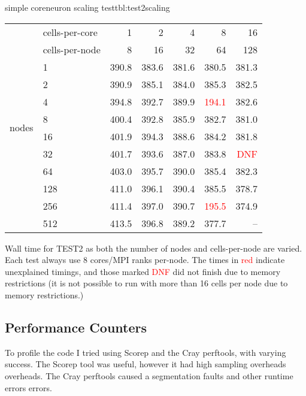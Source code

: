 \begin{mytable}{simple coreneuron scaling test}{tbl:test2scaling}
\begin{center}
\begin{tabular}{l|l|rrrrr}
\multirow{2}{*}{}
& cells-per-core  &    1  & 2     & 4     & 8  & 16  \\
& cells-per-node  &    8  & 16    & 32    & 64 & 128 \\
\hline
\multirow{8}{*}{nodes}
&1                & 390.8 & 383.6 & 381.6 & 380.5 & 381.3\\
&2                & 390.9 & 385.1 & 384.0 & 385.3 & 382.5\\
&4                & 394.8 & 392.7 & 389.9 & \textcolor{red}{194.1} & 382.6\\
&8                & 400.4 & 392.8 & 385.9 & 382.7 & 381.0\\
&16               & 401.9 & 394.3 & 388.6 & 384.2 & 381.8\\
&32               & 401.7 & 393.6 & 387.0 & 383.8 & \textcolor{red}{DNF}\\
&64               & 403.0 & 395.7 & 390.0 & 385.4 & 382.3 \\
&128              & 411.0 & 396.1 & 390.4 & 385.5 & 378.7 \\
&256              & 411.4 & 397.0 & 390.7 & \textcolor{red}{195.5} & 374.9\\
&512              & 413.5 & 396.8 & 389.2 & 377.7 & --\\
\end{tabular}
\end{center}
\vspace{10pt}
Wall time for TEST2 as both the number of nodes and cells-per-node are varied. Each test always use 8 cores/MPI ranks per-node. The times in \textcolor{red}{red} indicate unexplained timings, and those marked \textcolor{red}{DNF} did not finish due to memory restrictions (it is not possible to run with more than 16 cells per node due to memory restrictions.)
\end{mytable}

\subsection{Performance Counters}
To profile the code I tried using Scorep and the Cray perftools, with varying success. The Scorep tool was useful, however it had high sampling overheads overheads. The Cray perftools caused a segmentation faults and other runtime errors errors.


